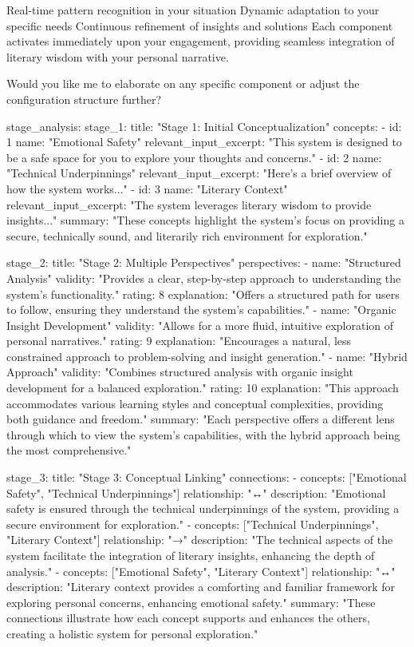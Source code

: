 {Real-time pattern recognition in your situation
Dynamic adaptation to your specific needs
Continuous refinement of insights and solutions
Each component activates immediately upon your engagement, providing seamless integration of literary wisdom with your personal narrative.

Would you like me to elaborate on any specific component or adjust the configuration structure further?

stage_analysis:
  stage_1:
    title: "Stage 1: Initial Conceptualization"
    concepts:
      - id: 1
        name: "Emotional Safety"
        relevant_input_excerpt: "This system is designed to be a safe space for you to explore your thoughts and concerns."
      - id: 2
        name: "Technical Underpinnings"
        relevant_input_excerpt: "Here's a brief overview of how the system works..."
      - id: 3
        name: "Literary Context"
        relevant_input_excerpt: "The system leverages literary wisdom to provide insights..."
    summary: "These concepts highlight the system's focus on providing a secure, technically sound, and literarily rich environment for exploration."

  stage_2:
    title: "Stage 2: Multiple Perspectives"
    perspectives:
      - name: "Structured Analysis"
        validity: "Provides a clear, step-by-step approach to understanding the system's functionality."
        rating: 8
        explanation: "Offers a structured path for users to follow, ensuring they understand the system's capabilities."
      - name: "Organic Insight Development"
        validity: "Allows for a more fluid, intuitive exploration of personal narratives."
        rating: 9
        explanation: "Encourages a natural, less constrained approach to problem-solving and insight generation."
      - name: "Hybrid Approach"
        validity: "Combines structured analysis with organic insight development for a balanced exploration."
        rating: 10
        explanation: "This approach accommodates various learning styles and conceptual complexities, providing both guidance and freedom."
    summary: "Each perspective offers a different lens through which to view the system's capabilities, with the hybrid approach being the most comprehensive."

  stage_3:
    title: "Stage 3: Conceptual Linking"
    connections:
      - concepts: ["Emotional Safety", "Technical Underpinnings"]
        relationship: "↔"
        description: "Emotional safety is ensured through the technical underpinnings of the system, providing a secure environment for exploration."
      - concepts: ["Technical Underpinnings", "Literary Context"]
        relationship: "→"
        description: "The technical aspects of the system facilitate the integration of literary insights, enhancing the depth of analysis."
      - concepts: ["Emotional Safety", "Literary Context"]
        relationship: "↔"
        description: "Literary context provides a comforting and familiar framework for exploring personal concerns, enhancing emotional safety."
    summary: "These connections illustrate how each concept supports and enhances the others, creating a holistic system for personal exploration."

}
